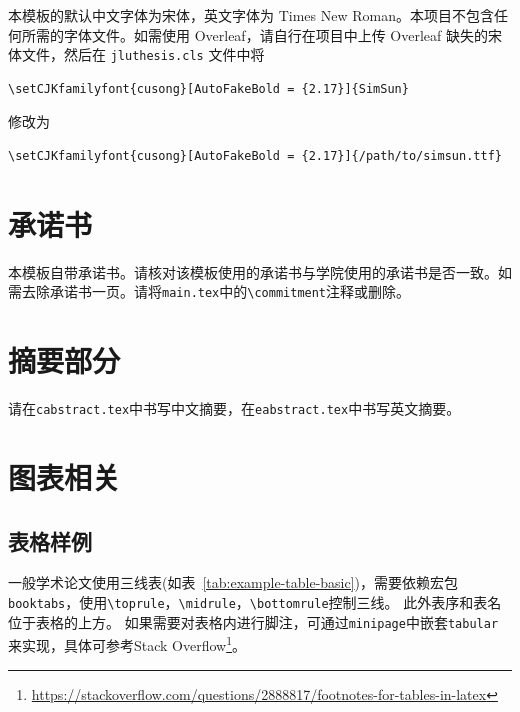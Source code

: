 本模板的默认中文字体为宋体，英文字体为 Times New Roman。本项目不包含任何所需的字体文件。如需使用 Overleaf，请自行在项目中上传 Overleaf 缺失的宋体文件，然后在 \verb|jluthesis.cls| 文件中将 
\begin{Verbatim}
\setCJKfamilyfont{cusong}[AutoFakeBold = {2.17}]{SimSun}
\end{Verbatim}
修改为
\begin{Verbatim}
\setCJKfamilyfont{cusong}[AutoFakeBold = {2.17}]{/path/to/simsun.ttf}
\end{Verbatim}

\section{承诺书}
\label{sec:commitment}

本模板自带承诺书。请核对该模板使用的承诺书与学院使用的承诺书是否一致。如需去除承诺书一页。请将\verb|main.tex|中的\verb|\commitment|注释或删除。

\section{摘要部分}
\label{sec:abstract}

请在\verb|cabstract.tex|中书写中文摘要，在\verb|eabstract.tex|中书写英文摘要。


\section{图表相关}
\label{sec:table-figure}

\subsection{表格样例}
\label{sec:table-example}

一般学术论文使用三线表(如表~\ref{tab:example-table-basic})，需要依赖宏包\verb|booktabs|，使用\verb|\toprule|，\verb|\midrule|，\verb|\bottomrule|控制三线。
此外表序和表名位于表格的上方。
如果需要对表格内进行脚注，可通过\texttt{minipage}中嵌套\texttt{tabular}来实现，具体可参考Stack Overflow\footnote{\url{https://stackoverflow.com/questions/2888817/footnotes-for-tables-in-latex}}。

